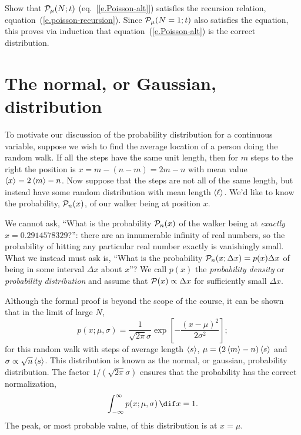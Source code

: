 \begin{exercisebox}
Show that $\mathcal{P}_{\mu}(N;t)$ (eq.~[\ref{e.Poisson-alt}]) satisfies the recursion relation, equation~(\ref{e.poisson-recursion}). Since $\mathcal{P}_{\mu}(N=1;t)$ also satisfies the equation, this proves via induction that equation~(\ref{e.Poisson-alt}) is the correct distribution.
\end{exercisebox}

\section{The normal, or Gaussian, distribution}

To motivate our discussion of the probability distribution for a continuous variable, suppose we wish to find the average location of a person doing the random walk.  If all the steps have the same unit length, then for $m$ steps to the right the position is $x = m - (n-m) = 2m-n$ with mean value $\left\langle x\right\rangle = 2\left\langle m\right\rangle-n$.  Now suppose that the steps are not all of the same length, but instead have some random distribution with mean length $\left\langle\ell\right\rangle$. We'd like to know the probability, $\mathcal{P}_{n}(x)$, of our walker being at  position $x$.

We cannot ask, ``What is the probability $\mathcal{P}_{n}(x)$ of the walker being at \emph{exactly} $x=0.2914578329$?'': there are an innumerable infinity of real numbers, so the probability of hitting any particular real number exactly is vanishingly small.  What we instead must ask is, ``What is the probability $\mathcal{P}_{n}(x;\Delta x) = p(x)\Delta x$ of being in some interval $\Delta x$ about $x$''?  We call $p(x)$ the \emph{probability density} or \emph{probability distribution} and assume that $\mathcal{P}(x) \propto \Delta x$ for sufficiently small $\Delta x$.

Although the formal proof is beyond the scope of the course, it can be shown that in the limit of large $N$,
\begin{equation}\label{e.gaussian}
p(x; \mu,\sigma) = \frac{1}{\sqrt{2\pi}\sigma} \exp\left[-\frac{\left(x-\mu\right)^{2}}{2\sigma^{2}}\right];
\end{equation}
for this random walk with steps of average length $\left\langle s\right\rangle$, $\mu = (2\left\langle m\right\rangle-n)\left\langle s\right\rangle$ and $\sigma  \propto \sqrt{n}\left\langle s\right\rangle$.  This distribution is known as the normal, or gaussian, probability distribution.  The factor $1/(\sqrt{2\pi}\sigma)$ ensures that the probability has the correct normalization,
\[ \int_{-\infty}^{\infty}p(x;\mu,\sigma)\,\dif x = 1. \]
The peak, or most probable value, of this distribution is at $x=\mu$.


